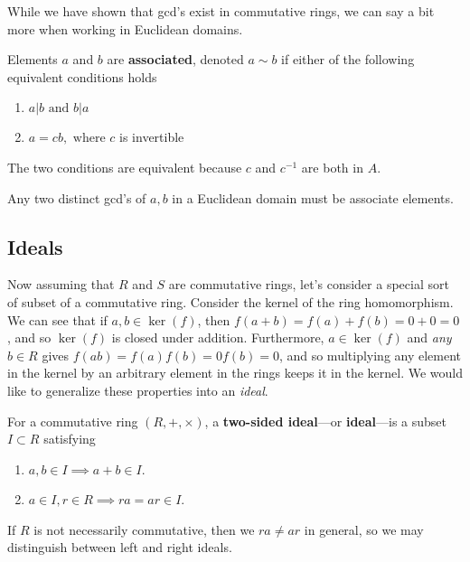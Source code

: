   While we have shown that gcd's exist in commutative rings, we can say a bit more when working in Euclidean domains. 

  \begin{definition}
    Elements $a$ and $b$ are \textbf{associated}, denoted $a \sim b$ if either of the following equivalent conditions holds
    \begin{enumerate}
        \item $a | b \text{ and } b | a$
        \item $a = c b, \text{ where } c$ is invertible
    \end{enumerate}
    The two conditions are equivalent because $c$ and $c^{-1}$ are both in $A$. 
  \end{definition} 

  \begin{theorem}
    Any two distinct gcd's of $a, b$ in a Euclidean domain must be associate elements. 
  \end{theorem}

\subsection{Ideals}

  Now assuming that $R$ and $S$ are commutative rings, let's consider a special sort of subset of a commutative ring. Consider the kernel of the ring homomorphism. We can see that if $a, b \in \ker(f)$, then $f(a + b) = f(a) + f(b) = 0 + 0 = 0$, and so $\ker(f)$ is closed under addition. Furthermore, $a \in \ker(f)$ and \textit{any} $b \in R$ gives $f(ab) = f(a) f(b) = 0 f(b) = 0$, and so multiplying any element in the kernel by an arbitrary element in the rings keeps it in the kernel. We would like to generalize these properties into an \textit{ideal}. 

  \begin{definition}[Ideals]
    For a commutative ring $(R,+, \times)$, a \textbf{two-sided ideal}---or \textbf{ideal}---is a subset $I \subset R$ satisfying 
    \begin{enumerate}
      \item $a, b \in I \implies a + b \in I$. 
      \item $a \in I, r \in R \implies ra = ar \in I$.
    \end{enumerate}
    If $R$ is not necessarily commutative, then we $ra \neq ar$ in general, so we may distinguish between left and right ideals. 
  \end{definition}

